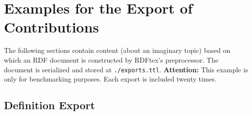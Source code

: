 
\section{Examples for the Export of Contributions}

The following sections contain content (about an imaginary topic) based on which an RDF document is constructed by RDFtex's preprocessor. The document is serialized and stored at \texttt{./exports.ttl}. \textbf{Attention:} This example is only for benchmarking purposes. Each export is included twenty times. 

\subsection{Definition Export}

